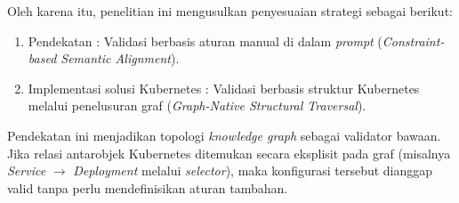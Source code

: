 Oleh karena itu, penelitian ini mengusulkan penyesuaian strategi sebagai berikut:

\begin{enumerate}[label=\textbf{A\arabic*.}]
    \item Pendekatan \textcite{wan2025empowering}: Validasi berbasis aturan manual di dalam \textit{prompt} (\textit{Constraint-based Semantic Alignment}).
    \item Implementasi solusi Kubernetes : Validasi berbasis struktur Kubernetes melalui penelusuran graf (\textit{Graph-Native Structural Traversal}).
\end{enumerate}

Pendekatan ini menjadikan topologi \textit{knowledge graph} sebagai validator bawaan. Jika relasi antarobjek Kubernetes ditemukan secara eksplisit pada graf (misalnya \textit{Service} $\rightarrow$ \textit{Deployment} melalui \textit{selector}), maka konfigurasi tersebut dianggap valid tanpa perlu mendefinisikan aturan tambahan.